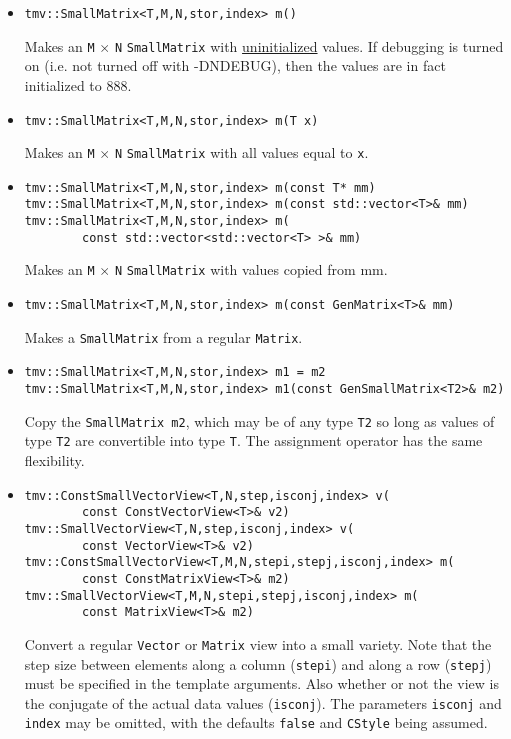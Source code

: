 \documentclass[twoside,letterpaper,11pt]{article}
\renewcommand{\tt}[1]{{\texttt {#1}}}
\begin{document}
\begin{itemize}
\item 
\begin{verbatim}
tmv::SmallMatrix<T,M,N,stor,index> m()
\end{verbatim}
Makes an \tt{M} $\times$ \tt{N} \tt{SmallMatrix} 
with \underline{uninitialized} values.
If debugging is turned on (i.e. not turned off
with -DNDEBUG), then the values are in fact initialized to 888. 

\item
\begin{verbatim}
tmv::SmallMatrix<T,M,N,stor,index> m(T x)
\end{verbatim}
Makes an \tt{M} $\times$ \tt{N} \tt{SmallMatrix} with all values equal to \tt{x}.

\item
\begin{verbatim}
tmv::SmallMatrix<T,M,N,stor,index> m(const T* mm)
tmv::SmallMatrix<T,M,N,stor,index> m(const std::vector<T>& mm)
tmv::SmallMatrix<T,M,N,stor,index> m(
        const std::vector<std::vector<T> >& mm)
\end{verbatim}
Makes an \tt{M} $\times$ \tt{N} \tt{SmallMatrix} with values copied from mm.

\item 
\begin{verbatim}
tmv::SmallMatrix<T,M,N,stor,index> m(const GenMatrix<T>& mm)
\end{verbatim}
Makes a \tt{SmallMatrix} from a regular \tt{Matrix}.

\item
\begin{verbatim}
tmv::SmallMatrix<T,M,N,stor,index> m1 = m2
tmv::SmallMatrix<T,M,N,stor,index> m1(const GenSmallMatrix<T2>& m2)
\end{verbatim}
Copy the \tt{SmallMatrix m2}, which may be of any type \tt{T2} so long
as values of type \tt{T2} are convertible into type \tt{T}.
The assignment operator has the same flexibility.

\item
\begin{verbatim}
tmv::ConstSmallVectorView<T,N,step,isconj,index> v(
        const ConstVectorView<T>& v2)
tmv::SmallVectorView<T,N,step,isconj,index> v(
        const VectorView<T>& v2)
tmv::ConstSmallVectorView<T,M,N,stepi,stepj,isconj,index> m(
        const ConstMatrixView<T>& m2)
tmv::SmallVectorView<T,M,N,stepi,stepj,isconj,index> m(
        const MatrixView<T>& m2)
\end{verbatim}
Convert a regular \tt{Vector} or \tt{Matrix} view into a
small variety.  Note that the step size between elements along a
column (\tt{stepi}) and along a row (\tt{stepj}) must be
specified in the template arguments.  Also whether or not the
view is the conjugate of the actual data values (\tt{isconj}).
The parameters \tt{isconj} and \tt{index} may be omitted,
with the defaults \tt{false} and \tt{CStyle} being assumed.


\end{itemize}
\end{document}
